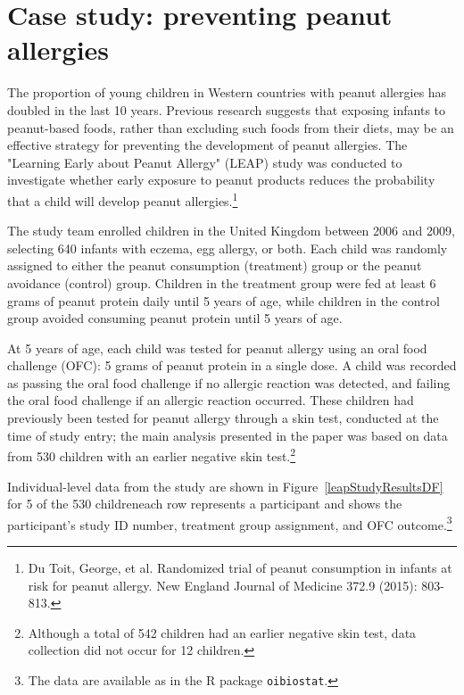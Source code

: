 \section[Case study]{Case study: preventing peanut allergies}
\label{leapCaseStudy}


The proportion of young children in Western countries with peanut allergies has doubled in the last 10 years. Previous research suggests that exposing infants to peanut-based foods, rather than excluding such foods from their diets, may be an effective strategy for preventing the development of peanut allergies. The "Learning Early about Peanut Allergy" (LEAP) study was conducted to investigate whether early exposure to peanut products reduces the probability that a child will develop peanut allergies.\footnote{Du Toit, George, et al. Randomized trial of peanut consumption in infants at risk for peanut allergy. New England Journal of Medicine 372.9 (2015): 803-813.}

The study team enrolled children in the United Kingdom between 2006 and 2009, selecting 640 infants with eczema, egg allergy, or both. Each child was randomly assigned to either the peanut consumption (treatment) group or the peanut avoidance (control) group. Children in the treatment group were fed at least 6 grams of peanut protein daily until 5 years of age, while children in the control group avoided consuming peanut protein until 5 years of age.

At 5 years of age, each child was tested for peanut allergy using an oral food challenge (OFC): 5 grams of peanut protein in a single dose. A child was recorded as passing the oral food challenge if no allergic reaction was detected, and failing the oral food challenge if an allergic reaction occurred. These children had previously been tested for peanut allergy through a skin test, conducted at the time of study entry; the main analysis presented in the paper was based on data from 530 children with an earlier negative skin test.\footnote{Although a total of 542 children had an earlier negative skin test, data collection did not occur for 12 children.} 

Individual-level data from the study are shown in Figure~\ref{leapStudyResultsDF} for 5 of the 530 children\textemdash each row represents a participant and shows the participant's study ID number, treatment group assignment, and OFC outcome.\footnote{The data are available as  in the \textsf{R} package \texttt{oibiostat}.}
 
